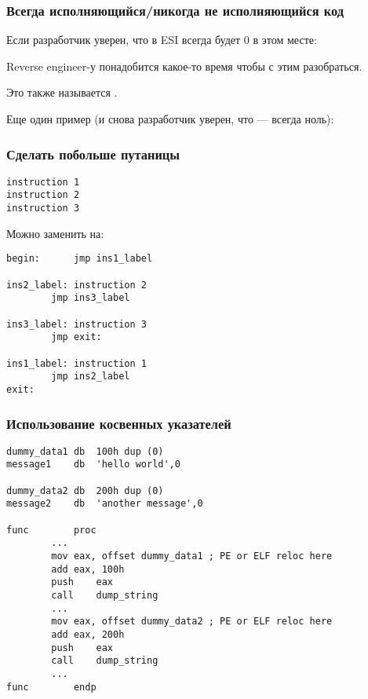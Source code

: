 \subsubsection{Всегда исполняющийся/никогда не исполняющийся код}

Если разработчик уверен, что в ESI всегда будет 0 в этом месте:



Reverse engineer-у понадобится какое-то время чтобы с этим разобраться.

Это также называется .

Еще один пример (и снова разработчик уверен, что  --- всегда ноль):



\subsubsection{Сделать побольше путаницы}

\begin{lstlisting}
instruction 1
instruction 2
instruction 3
\end{lstlisting}

Можно заменить на:

\begin{lstlisting}[style=customasm]
begin:		jmp	ins1_label

ins2_label:	instruction 2
		jmp	ins3_label

ins3_label:	instruction 3
		jmp	exit:

ins1_label:	instruction 1
		jmp	ins2_label
exit:
\end{lstlisting}

\subsubsection{Использование косвенных указателей}

\begin{lstlisting}[style=customasm]
dummy_data1	db	100h dup (0)
message1	db	'hello world',0

dummy_data2	db	200h dup (0)
message2	db	'another message',0

func		proc
		...
		mov	eax, offset dummy_data1 ; PE or ELF reloc here
		add	eax, 100h
		push	eax
		call	dump_string
		...
		mov	eax, offset dummy_data2 ; PE or ELF reloc here
		add	eax, 200h
		push	eax
		call	dump_string
		...
func		endp
\end{lstlisting}

